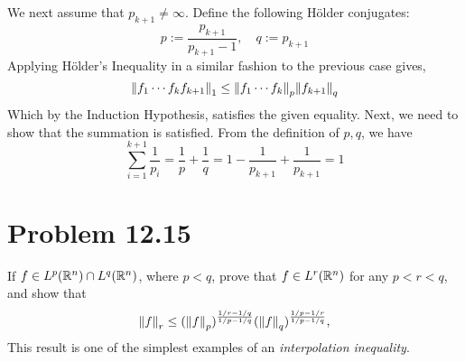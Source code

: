 \begin{solution}
\begin{itemize}
        \hop
        We next assume that $p_{k+1} \neq \infty$. Define the following H\"older conjugates:
        \[p := \frac{p_{k+1}}{p_{k+1} - 1}, \quad q := p_{k+1}\]
        Applying H\"older's Inequality in a similar fashion to the previous case gives, 
        \[\norm{f_1\cdots f_{k}f_{k+1}}_1 \leq \norm{f_1\cdots f_k}_p \norm{f_{k+1}}_q\]
        Which by the Induction Hypothesis, satisfies the given equality. Next, we need to show that the summation is satisfied. From the definition of $p, q$, we have
        \[\sum_{i =1}^{k+1}\frac{1}{p_i} = \frac{1}{p} + \frac{1}{q} = 1 - \frac{1}{p_{k+1}} + \frac{1}{p_{k+1}} = 1\]
    \end{itemize}
\end{solution}

\newpage
\section{Problem 12.15}
If $f \in L^p (\mathbb{R}^n) \cap L^q(\mathbb{R}^n)$, where $p < q$, prove that $f \in L^r(\mathbb{R}^n)$ for any $p < r < q$, and show that 
\[\norm{f}_r \leq (\norm{f}_p)^{\frac{1 / r - 1 / q}{1 / p - 1 / q}} (\norm{f}_q)^{\frac{1 / p - 1 / r}{1 / p - 1 / q}},\]
This result is one of the simplest examples of an \textit{interpolation inequality}.
\partbreak
